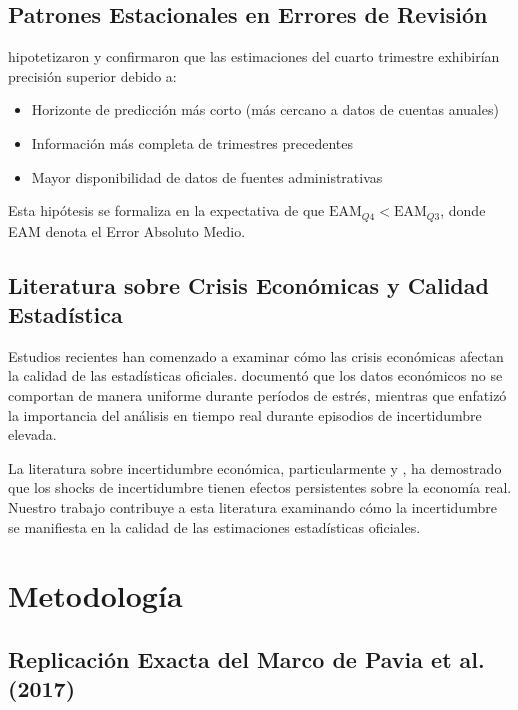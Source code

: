 \documentclass[12pt,a4paper]{article}
\begin{document}
\subsection{Patrones Estacionales en Errores de Revisión}

\citet{pavia2017} hipotetizaron y confirmaron que las estimaciones del cuarto trimestre exhibirían precisión superior debido a:

\begin{itemize}
\item Horizonte de predicción más corto (más cercano a datos de cuentas anuales)
\item Información más completa de trimestres precedentes  
\item Mayor disponibilidad de datos de fuentes administrativas
\end{itemize}

Esta hipótesis se formaliza en la expectativa de que $\text{EAM}_{Q4} < \text{EAM}_{Q3}$, donde EAM denota el Error Absoluto Medio.

\subsection{Literatura sobre Crisis Económicas y Calidad Estadística}

Estudios recientes han comenzado a examinar cómo las crisis económicas afectan la calidad de las estadísticas oficiales. \citet{aruoba2008} documentó que los datos económicos no se comportan de manera uniforme durante períodos de estrés, mientras que \citet{croushore2011} enfatizó la importancia del análisis en tiempo real durante episodios de incertidumbre elevada.

La literatura sobre incertidumbre económica, particularmente \citet{bloom2009} y \citet{baker2016}, ha demostrado que los shocks de incertidumbre tienen efectos persistentes sobre la economía real. Nuestro trabajo contribuye a esta literatura examinando cómo la incertidumbre se manifiesta en la calidad de las estimaciones estadísticas oficiales.

\section{Metodología}

\subsection{Replicación Exacta del Marco de Pavia et al. (2017)}
\end{document}
